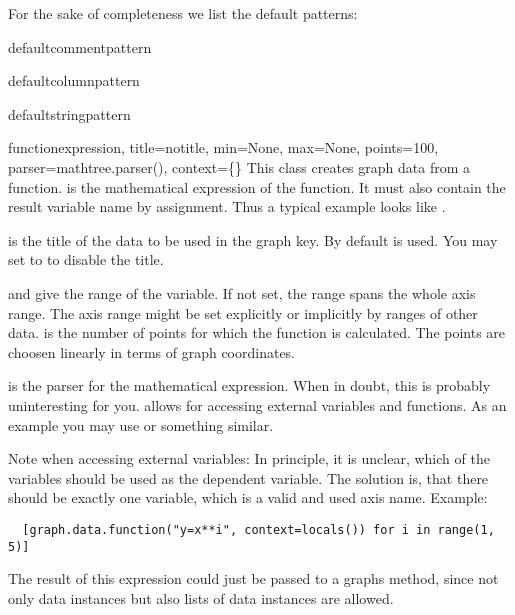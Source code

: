 For the sake of completeness we list the default patterns:

\begin{memberdesc}{defaultcommentpattern}
\end{memberdesc}

\begin{memberdesc}{defaultcolumnpattern}
\end{memberdesc}

\begin{memberdesc}{defaultstringpattern}
\end{memberdesc} %

\begin{classdesc}{function}{expression, title=notitle, %
                            min=None, max=None, points=100,
                            parser=mathtree.parser(),
                            context=\{\}}
  This class creates graph data from a function.  is
  the mathematical expression of the function. It must also contain
  the result variable name by assignment. Thus a typical example looks
  like .

   is the title of the data to be used in the graph key. By
  default  is used. You may set  to
   to disable the title.

   and  give the range of the variable. If not set,
  the range spans the whole axis range. The axis range might be set
  explicitly or implicitly by ranges of other data.  is
  the number of points for which the function is calculated. The
  points are choosen linearly in terms of graph coordinates.

   is the parser for the mathematical expression. When in
  doubt, this is probably uninteresting for you.  allows
  for accessing external variables and functions. As an example you
  may use  or something similar.

  Note when accessing external variables: In principle, it is unclear, 
  which of the variables should be used as the
  dependent variable. The solution is, that there should be exactly
  one variable, which is a valid and used axis name.
  Example:
  \begin{verbatim}
  [graph.data.function("y=x**i", context=locals()) for i in range(1, 5)]
  \end{verbatim}
  The result of this expression could just be passed to a graphs
   method, since not only data instances but also lists
  of data instances are allowed.
\end{classdesc} %

